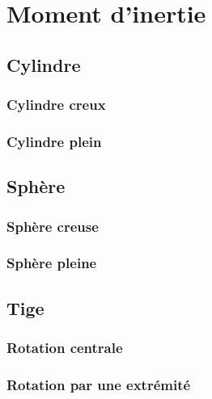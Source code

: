 \documentclass[a4paper,10pt]{book} %
\begin{document}
\section{Moment d'inertie}
\subsection{Cylindre}
\subsubsection{Cylindre creux}


\subsubsection{Cylindre plein}


\subsection{Sphère}
\subsubsection{Sphère creuse}


\subsubsection{Sphère pleine}


\subsection{Tige}
\subsubsection{Rotation centrale}


\subsubsection{Rotation par une extrémité}
\end{document}
